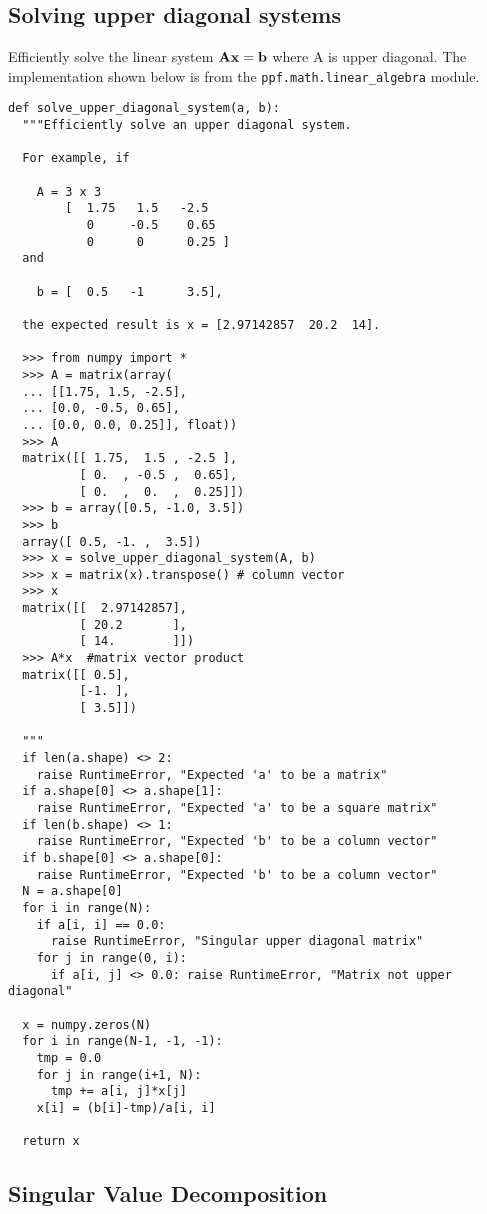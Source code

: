 \subsection{Solving upper diagonal systems}
Efficiently solve the linear system $\bf{A}\bf{x} = \bf{b}$ where A is
upper diagonal. The implementation shown below is from the
\verb|ppf.math.linear_algebra| module.
\begin{verbatim}
def solve_upper_diagonal_system(a, b):
  """Efficiently solve an upper diagonal system.

  For example, if

    A = 3 x 3
        [  1.75   1.5   -2.5
           0     -0.5    0.65
           0      0      0.25 ]
  and

    b = [  0.5   -1      3.5],

  the expected result is x = [2.97142857  20.2  14].
  
  >>> from numpy import *
  >>> A = matrix(array(
  ... [[1.75, 1.5, -2.5],
  ... [0.0, -0.5, 0.65],
  ... [0.0, 0.0, 0.25]], float))
  >>> A
  matrix([[ 1.75,  1.5 , -2.5 ],
          [ 0.  , -0.5 ,  0.65],
          [ 0.  ,  0.  ,  0.25]])
  >>> b = array([0.5, -1.0, 3.5])
  >>> b
  array([ 0.5, -1. ,  3.5])
  >>> x = solve_upper_diagonal_system(A, b)
  >>> x = matrix(x).transpose() # column vector
  >>> x
  matrix([[  2.97142857],
          [ 20.2       ],
          [ 14.        ]])
  >>> A*x  #matrix vector product
  matrix([[ 0.5],
          [-1. ],
          [ 3.5]])

  """
  if len(a.shape) <> 2:
    raise RuntimeError, "Expected 'a' to be a matrix"
  if a.shape[0] <> a.shape[1]:
    raise RuntimeError, "Expected 'a' to be a square matrix"
  if len(b.shape) <> 1:
    raise RuntimeError, "Expected 'b' to be a column vector"
  if b.shape[0] <> a.shape[0]:
    raise RuntimeError, "Expected 'b' to be a column vector"
  N = a.shape[0]
  for i in range(N):
    if a[i, i] == 0.0:
      raise RuntimeError, "Singular upper diagonal matrix"
    for j in range(0, i):
      if a[i, j] <> 0.0: raise RuntimeError, "Matrix not upper diagonal"
      
  x = numpy.zeros(N)
  for i in range(N-1, -1, -1):
    tmp = 0.0
    for j in range(i+1, N):
      tmp += a[i, j]*x[j]
    x[i] = (b[i]-tmp)/a[i, i]

  return x
\end{verbatim}

\subsection{Singular Value Decomposition}

